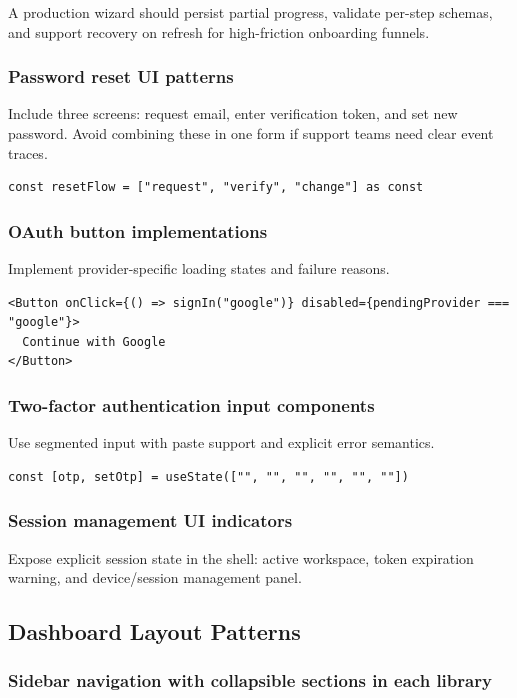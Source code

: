 A production wizard should persist partial progress, validate per-step schemas, and support recovery on refresh for high-friction onboarding funnels.

\subsubsection{Password reset UI patterns}
Include three screens: request email, enter verification token, and set new password. Avoid combining these in one form if support teams need clear event traces.

\begin{verbatim}
const resetFlow = ["request", "verify", "change"] as const
\end{verbatim}

\subsubsection{OAuth button implementations}
Implement provider-specific loading states and failure reasons.

\begin{verbatim}
<Button onClick={() => signIn("google")} disabled={pendingProvider === "google"}>
  Continue with Google
</Button>
\end{verbatim}

\subsubsection{Two-factor authentication input components}
Use segmented input with paste support and explicit error semantics.

\begin{verbatim}
const [otp, setOtp] = useState(["", "", "", "", "", ""])
\end{verbatim}

\subsubsection{Session management UI indicators}
Expose explicit session state in the shell: active workspace, token expiration warning, and device/session management panel.

\subsection{Dashboard Layout Patterns}

\subsubsection{Sidebar navigation with collapsible sections in each library}

